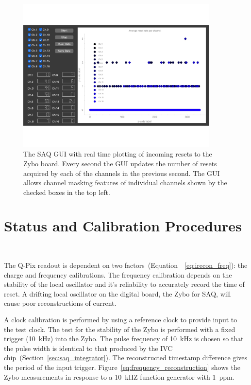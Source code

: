 \begin{figure}[]
\centering
\includegraphics[width=0.9\textwidth]{images/SAQ_gui_resets.pdf}
\caption{The SAQ GUI with real time plotting of incoming resets to the Zybo board.
Every second the GUI updates the number of resets acquired by each of the channels in the previous second.
The GUI allows channel masking features of individual channels shown by the checked boxes in the top left.
}
\label{fig:saq_gui}
\end{figure}


\section{Status and Calibration Procedures}~\label{sec:saq_calib}

The Q-Pix readout is dependent on two factors~(Equation~~\ref{eq:irecon_freq}): the charge and frequency calibrations.
The frequency calibration depends on the stability of the local oscillator and it's reliability to accurately record the time of reset.
A drifting local oscillator on the digital board, the Zybo for SAQ, will cause poor reconstructions of current.

A clock calibration is performed by using a reference clock to provide input to the test clock.
The test for the stability of the Zybo is performed with a fixed trigger (10~\unit{kHz}) into the Zybo.
The pulse frequency of 10~\unit{kHz} is chosen so that the pulse width is identical to that produced by the IVC chip~(Section~\ref{sec:saq_integrator}).
The reconstructed timestamp difference gives the period of the input trigger.
Figure~\ref{eq:frequency_reconstruction} shows the Zybo measurements in response to a 10~\unit{kHZ} function generator with 1~\unit{ppm}.

